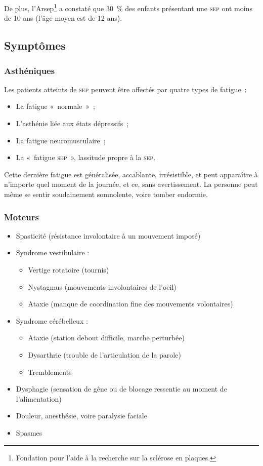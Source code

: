 \documentclass[a4paper,12pt,francais]{article}
\newcommand{\SEP}{\textsc{sep}\xspace}
\begin{document}
De plus, l’Arsep\footnote{Fondation pour l'aide à la recherche sur la sclérose en plaques.} a constaté que 30~\% des enfants présentant une \SEP{} ont moins de 10 ans (l’âge moyen est de 12 ans).

\subsection{Symptômes}

\subsubsection{Asthéniques}
Les patients atteints de \SEP{} peuvent être affectés par quatre types de fatigue~:
\begin{itemize}
    \item La fatigue «~normale~»~;
    \item L’asthénie liée aux états dépressifs~;
    \item La fatigue neuromusculaire~;
    \item La «~fatigue \SEP{}~», lassitude propre à la \SEP{}.
\end{itemize}

Cette dernière fatigue est généralisée, accablante, irrésistible, et peut apparaître à n’importe quel moment de la journée, et ce, sans avertissement. La personne peut même se sentir soudainement somnolente, voire tomber endormie.

\subsubsection{Moteurs}
\begin{itemize}
    \item Spasticité (résistance involontaire à un mouvement imposé)
    \item Syndrome vestibulaire :
        \begin{itemize}
            \item Vertige rotatoire (tournis)
            \item Nystagmus (mouvements involontaires de l'oeil)
            \item Ataxie (manque de coordination fine des mouvements volontaires)
        \end{itemize}
    \item Syndrome cérébelleux :
        \begin{itemize}
            \item Ataxie (station debout difficile, marche perturbée)
            \item Dysarthrie (trouble de l'articulation de la parole)
            \item Tremblements
        \end{itemize}
    \item Dysphagie (sensation de gêne ou de blocage ressentie au moment de l'alimentation)
    \item Douleur, anesthésie, voire paralysie faciale
    \item Spasmes
\end{itemize}
\end{document}
